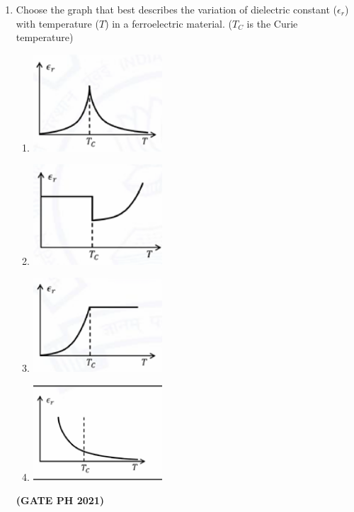 \documentclass[14pt, a4paper]{extarticle}
\begin{document}
\begin{enumerate}[label=\textbf{Q.\arabic*}]
\begin{enumerate}[label=\textbf{Q.\arabic*}]

\item Choose the graph that best describes the variation of dielectric constant ($\epsilon_r$) with temperature ($T$) in a ferroelectric material. ($T_C$ is the Curie temperature)
\begin{enumerate}
    \item \includegraphics[width=0.4\textwidth]{figs/q11fig21.png}
    \item \includegraphics[width=0.4\textwidth]{figs/q11figb21.png}
    \item \includegraphics[width=0.4\textwidth]{figs/q11figc21.png}
    \item \includegraphics[width=0.4\textwidth]{figs/q11figd21.png}
\end{enumerate}
\hfill \textbf{(GATE PH 2021)}



\end{enumerate}
\end{enumerate}
\end{document}
